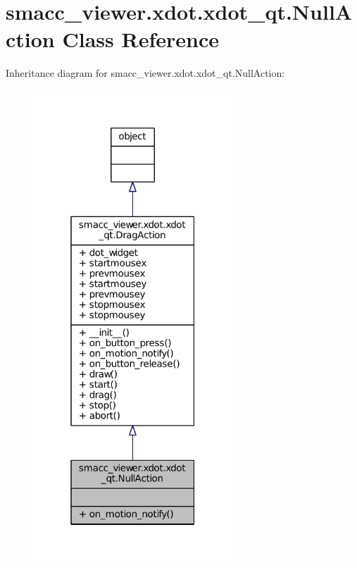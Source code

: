 \hypertarget{classsmacc__viewer_1_1xdot_1_1xdot__qt_1_1NullAction}{}\section{smacc\+\_\+viewer.\+xdot.\+xdot\+\_\+qt.\+Null\+Action Class Reference}
\label{classsmacc__viewer_1_1xdot_1_1xdot__qt_1_1NullAction}


Inheritance diagram for smacc\+\_\+viewer.\+xdot.\+xdot\+\_\+qt.\+Null\+Action\+:
\nopagebreak
\begin{figure}[H]
\begin{center}
\leavevmode
\includegraphics[width=211pt]{classsmacc__viewer_1_1xdot_1_1xdot__qt_1_1NullAction__inherit__graph}
\end{center}
\end{figure}


